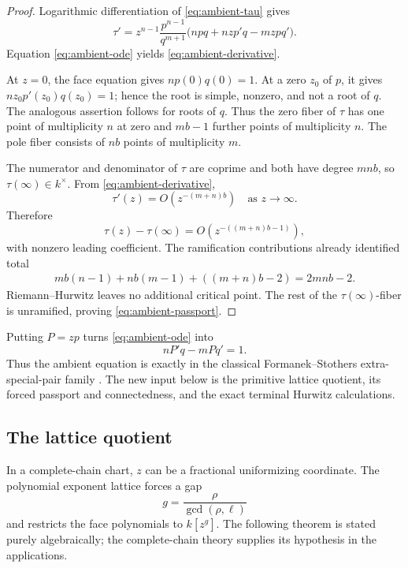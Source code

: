 \documentclass[11pt,reqno]{amsart}
\begin{document}
\begin{proof}
Logarithmic differentiation of \eqref{eq:ambient-tau} gives
\[
\tau'
=z^{n-1}\frac{p^{n-1}}{q^{m+1}}
\bigl(npq+nzp'q-mzpq'\bigr).
\]
Equation \eqref{eq:ambient-ode} yields
\eqref{eq:ambient-derivative}.

At \(z=0\), the face equation gives \(np(0)q(0)=1\).  At a zero
\(z_0\) of \(p\), it gives \(nz_0p'(z_0)q(z_0)=1\); hence the root is
simple, nonzero, and not a root of \(q\).  The analogous assertion follows
for roots of \(q\).  Thus the zero fiber of \(\tau\) has one point of
multiplicity \(n\) at zero and \(mb-1\) further points of multiplicity
\(n\).  The pole fiber consists of \(nb\) points of multiplicity \(m\).

The numerator and denominator of \(\tau\) are coprime and both have degree
\(mnb\), so \(\tau(\infty)\in k^\times\).  From
\eqref{eq:ambient-derivative},
\[
\tau'(z)=O\!\left(z^{-(m+n)b}\right)
\quad\text{as }z\longrightarrow\infty.
\]
Therefore
\[
\tau(z)-\tau(\infty)
=O\!\left(z^{-((m+n)b-1)}\right),
\]
with nonzero leading coefficient.  The ramification contributions already
identified total
\begin{align*}
mb(n-1)+nb(m-1)+((m+n)b-2)
=2mnb-2.
\end{align*}
Riemann--Hurwitz leaves no additional critical point.  The rest of the
\(\tau(\infty)\)-fiber is unramified, proving
\eqref{eq:ambient-passport}.
\end{proof}

\begin{remark}
Putting \(P=zp\) turns \eqref{eq:ambient-ode} into
\[
 nP'q-mPq'=1.
\]
Thus the ambient equation is exactly in the classical Formanek--Stothers
extra-special-pair family \cite{formanek2011stothers}.  The new input below
is the primitive lattice quotient, its forced passport and connectedness,
and the exact terminal Hurwitz calculations.
\end{remark}

\subsection{The lattice quotient}

In a complete-chain chart, \(z\) can be a fractional uniformizing
coordinate.  The polynomial exponent lattice forces a gap
\[
g=\frac{\rho}{\gcd(\rho,\ell)}
\]
and restricts the face polynomials to \(k[z^g]\).  The following theorem is
stated purely algebraically; the complete-chain theory supplies its
hypothesis in the applications.
\end{document}
